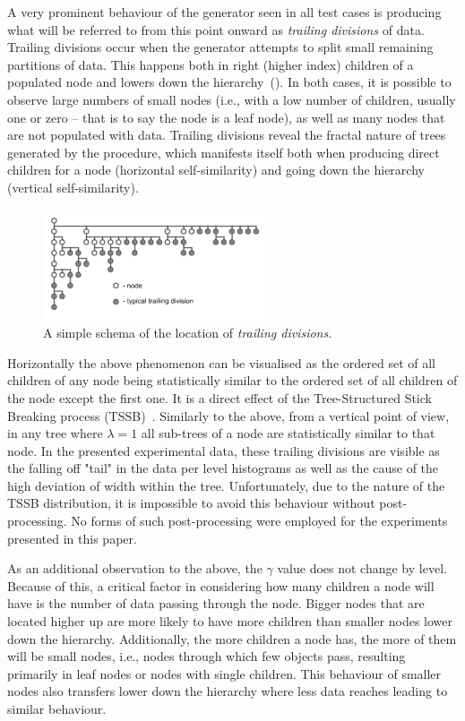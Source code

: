\documentclass{article}
\begin{document}
	A very prominent behaviour of the generator seen in all test cases is producing what will be referred to from this point onward as \textit{trailing divisions} of data. Trailing divisions occur when the generator attempts to split small remaining partitions of data. This happens both in right (higher index) children of a populated node and lowers down the hierarchy~(). In both cases, it is possible to observe large numbers of small nodes (i.e., with a low number of children, usually one or zero -- that is to say the node is a leaf node), as well as many nodes that are not populated with data. Trailing divisions reveal the fractal nature of trees generated by the procedure, which manifests itself both when producing direct children for a node (horizontal self-similarity) and going down the hierarchy (vertical self-similarity).
	\begin{figure}[H]
		\centering
		\includegraphics [scale=1.5] {trailing.pdf}
		\caption{A simple schema of the location of \textit{trailing divisions}.}
		\label{fig:trailing}
	\end{figure}
	Horizontally the above phenomenon can be visualised as the ordered set of all children of any node being statistically similar to the ordered set of all children of the node except the first one. It is a direct effect of the Tree-Structured Stick Breaking process (TSSB)~\cite{ghahramani2010tree}. Similarly to the above, from a vertical point of view, in any tree where $\lambda = 1$ all sub-trees of a node are statistically similar to that node. In the presented experimental data, these trailing divisions are visible as the falling off "tail" in the data per level histograms as well as the cause of the high deviation of width within the tree. Unfortunately, due to the nature of the TSSB distribution, it is impossible to avoid this behaviour without post-processing. No forms of such post-processing were employed for the experiments presented in this paper.
    
    As an additional observation to the above, the $\gamma$ value does not change by level. Because of this, a critical factor in considering how many children a node will have is the number of data passing through the node. Bigger nodes that are located higher up are more likely to have more children than smaller nodes lower down the hierarchy. Additionally, the more children a node has, the more of them will be small nodes, i.e., nodes through which few objects pass, resulting primarily in leaf nodes or nodes with single children. This behaviour of smaller nodes also transfers lower down the hierarchy where less data reaches leading to similar behaviour.
    
\end{document}
